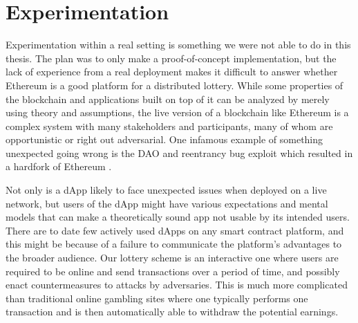 \section{Experimentation}
\label{sec:experimentation}

Experimentation within a real setting is something we were not able to do in this thesis. The plan was to only make a proof-of-concept implementation, but the lack of experience from a real deployment makes it difficult to answer whether Ethereum is a good platform for a distributed lottery. While some properties of the blockchain and applications built on top of it can be analyzed by merely using theory and assumptions, the live version of a blockchain like Ethereum is a complex system with many stakeholders and participants, many of whom are opportunistic or right out adversarial. One infamous example of something unexpected going wrong is the DAO and reentrancy bug exploit which resulted in a hardfork of Ethereum \cite{dhillon_dao_2017}. 

Not only is a dApp likely to face unexpected issues when deployed on a live network, but users of the dApp might have various expectations and mental models that can make a theoretically sound app not usable by its intended users. There are to date few actively used dApps on any smart contract platform, and this might be because of a failure to communicate the platform's advantages to the broader audience. Our lottery scheme is an interactive one where users are required to be online and send transactions over a period of time, and possibly enact countermeasures to attacks by adversaries. This is much more complicated than traditional online gambling sites where one typically performs one transaction and is then automatically able to withdraw the potential earnings. 
